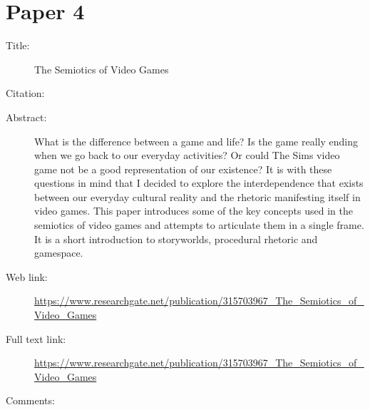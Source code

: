 \documentclass{scrartcl}
\begin{document}
\section*{Paper 4}
\begin{description}
\item[Title:] The Semiotics of Video Games
\item[Citation:] \cite{Bruchansky}
\item[Abstract:] What is the difference between a game and life? Is the game really ending when we go back to our everyday activities? Or could The Sims video game not be a good representation of our existence? It is with these questions in mind that I decided to explore the interdependence that exists between our everyday cultural reality and the rhetoric manifesting itself in video games. This paper introduces some of the key concepts used in the semiotics of video games and attempts to articulate them in a single frame. It is a short introduction to storyworlds, procedural rhetoric and gamespace. 
\item[Web link:]\url {https://www.researchgate.net/publication/315703967_The_Semiotics_of_Video_Games}
\item[Full text link:]\url {https://www.researchgate.net/publication/315703967_The_Semiotics_of_Video_Games}
\item[Comments:] 
\end{description}
\end{document}
